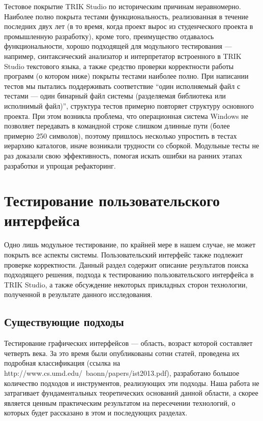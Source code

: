 \documentclass[conference]{IEEEtran}
\begin{document}
Тестовое покрытие TRIK Studio по историческим причинам неравномерно. Наиболее полно 
покрыта тестами функциональность, реализованная в течение последних двух лет (в то время, 
когда проект вырос из студенческого проекта в промышленную разработку), кроме того, 
преимущество отдавалось функциональности, хорошо подходящей для модульного тестирования 
--- например, синтаксический анализатор и интерпретатор встроенного в TRIK Studio 
текстового языка, а также средство проверки корректности работы программ (о котором ниже) 
покрыты тестами наиболее полно. При написании тестов мы пытались поддерживать соответствие 
"`один исполняемый файл с тестами --- один бинарный файл системы (разделяемая библиотека 
или исполнимый файл)"', структура тестов примерно повторяет структуру основного проекта. 
При этом возникла проблема, что операционная система Windows не позволяет передавать 
в командной строке слишком длинные пути (более примерно 250 символов), поэтому пришлось 
несколько упростить в тестах иерархию каталогов, иначе возникали трудности со сборкой. 
Модульные тесты не раз доказали свою эффективность, помогая искать ошибки на ранних этапах 
разработки и упрощая рефакторинг.

\section{Тестирование пользовательского интерфейса}
Одно лишь модульное тестирование, по крайней мере в нашем случае, не может покрыть 
все аспекты системы. Пользовательский интерфейс также подлежит проверке корректности. 
Данный раздел содержит описание результатов поиска подходящего решения, подхода к 
тестированию пользовательского интерфейса в TRIK Studio, а также обсуждение некоторых 
прикладных сторон технологии, полученной в результате данного исследования.

\subsection{Существующие подходы}
Тестирование графических интерфейсов --- область, возраст которой составляет четверть 
века. За это время были опубликованы сотни статей, проведена их подробная классификация 
(ссылка на http://www.cs.umd.edu/~baonn/papers/ist2013.pdf), разработано большое количество 
подходов и инструментов, реализующих эти подходы. Наша работа не затрагивает фундаментальных 
теоретических оснований данной области, а скорее является ценным практическим результатом 
на пересечении технологий, о которых будет рассказано в этом и последующих разделах.
\end{document}

